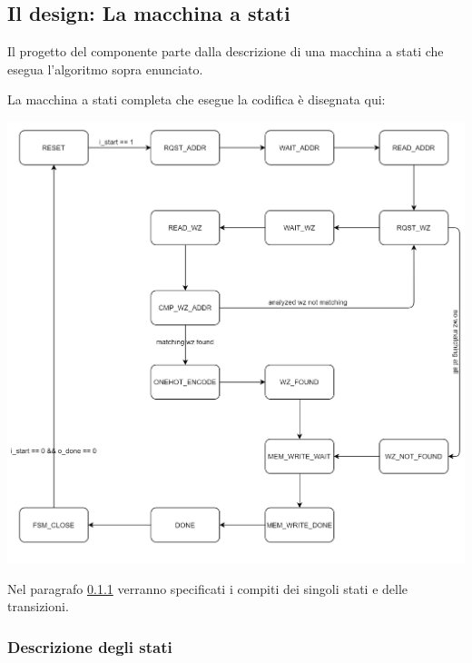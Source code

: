 \documentclass{article}
\begin{document}
\newpage

\subsection{Il design: La macchina a stati}

Il progetto del componente parte dalla descrizione di una macchina a stati che esegua l'algoritmo sopra enunciato.

La macchina a stati completa che esegue la codifica è disegnata qui:

\begin{flushleft}
\includegraphics[scale=0.45]{FSM}
\end{flushleft}

Nel paragrafo \ref{fsm} verranno specificati i compiti dei singoli stati e delle transizioni.

\newpage

\subsubsection{Descrizione degli stati}\label{fsm}
\end{document}

